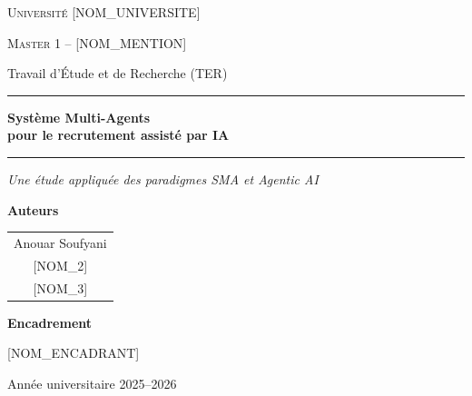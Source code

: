 \begin{titlepage}
\centering
\vspace*{1.5cm}

{\scshape\Large Université [NOM\_UNIVERSITE] \par}
{\scshape Master 1 -- [NOM\_MENTION] \par}
\vspace{0.5cm}
{\large Travail d'Étude et de Recherche (TER) \par}

\vspace{2.5cm}
\rule{0.85\textwidth}{0.6pt}
\vspace{0.6cm}

{\Huge\bfseries Système Multi-Agents \\[0.4em]
pour le recrutement assisté par IA \par}

\vspace{0.6cm}
\rule{0.85\textwidth}{0.6pt}

\vspace{0.8cm}
{\Large\itshape Une étude appliquée des paradigmes SMA et Agentic AI \par}

\vfill

{\large\bfseries Auteurs \par}
\vspace{0.3cm}
\begin{tabular}{c}
    Anouar Soufyani \\
    {[NOM\_2]} \\
    {[NOM\_3]} \\
\end{tabular}

\vspace{1.2cm}

{\large\bfseries Encadrement \par}
\vspace{0.3cm}
{[NOM\_ENCADRANT]}

\vfill

{\large Année universitaire 2025--2026 \par}

\end{titlepage}

\thispagestyle{empty}
\cleardoublepage
